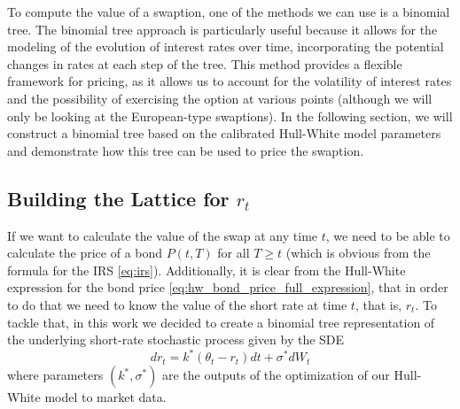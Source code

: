\documentclass[titlepage, 12pt]{article}
\begin{document}
	To compute the value of a swaption, one of the methods we can use is a binomial tree. The binomial tree approach is particularly useful because it allows for the modeling of the evolution of interest rates over time, incorporating the potential changes in rates at each step of the tree. This method provides a flexible framework for pricing, as it allows us to account for the volatility of interest rates and the possibility of exercising the option at various points (although we will only be looking at the European-type swaptions). In the following section, we will construct a binomial tree based on the calibrated Hull-White model parameters and demonstrate how this tree can be used to price the swaption.
	
	\subsection{Building the Lattice for $r_t$}
	
	If we want to calculate the value of the swap at any time $t$, we need to be able to calculate the price of a bond $P(t,T)$ for all $T\geq t$ (which is obvious from the formula for the IRS \eqref{eq:irs}). Additionally, it is clear from the Hull-White expression for the bond price \eqref{eq:hw_bond_price_full_expression}, that in order to do that we need to know the value of the short rate at time $t$, that is, $r_t$. To tackle that, in this work we decided to create a binomial tree representation of the underlying short-rate stochastic process given by the SDE
	\begin{equation}
		dr_t = k^*(\theta_t - r_t)dt + \sigma^* dW_t
	\end{equation}
	where parameters $(k^*,\sigma^*)$ are the outputs of the optimization of our Hull-White model to market data. 
	
\end{document}
